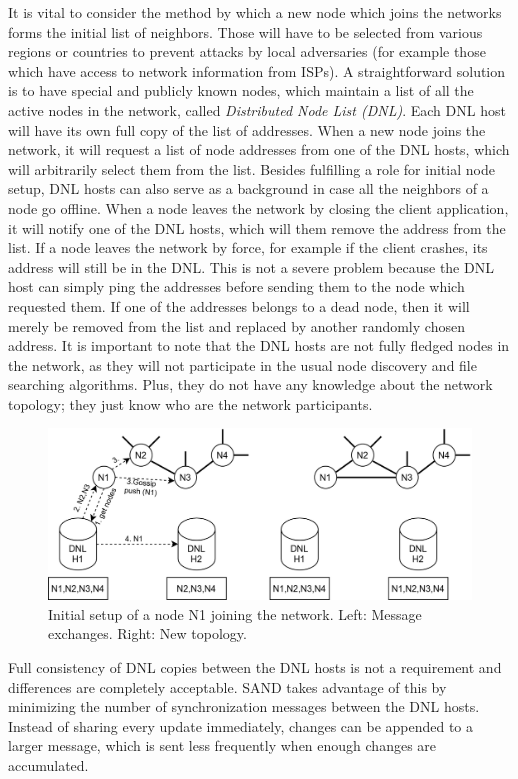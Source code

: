 It is vital to consider the method by which a new node which joins the networks 
forms the initial list of neighbors. Those will have to be selected from 
various regions or countries to prevent attacks by local adversaries (for 
example those which have access to network information from ISPs). A 
straightforward solution is to have special and publicly known nodes, which 
maintain a list of all the active nodes in the network, called 
\textit{Distributed Node List (DNL)}. Each DNL host will have its own full copy 
of the list of addresses. When a new node joins the network, it will request a 
list of node addresses from one of the DNL hosts, which will arbitrarily select 
them from the list. Besides fulfilling a role for initial node setup, DNL hosts 
can also serve as a background in case all the neighbors of a node go offline. 
When a node leaves the network by closing the client application, it will 
notify one of the DNL hosts, which will them remove the address from the list. 
If a node leaves the network by force, for example if the client crashes, its 
address will still be in the DNL. This is not a severe problem because the DNL 
host can simply ping the addresses before sending them to the node which 
requested them. If one of the addresses belongs to a dead node, then it will 
merely be removed from the list and replaced by another randomly chosen 
address. It is important to note that the DNL hosts are not fully fledged nodes 
in the network, as they will not participate in the usual node discovery and 
file searching algorithms. Plus, they do not have any knowledge about the 
network topology; they just know who are the network participants.

\begin{figure}
    \centering
    \includegraphics[width=\textwidth]{figures/fig2}
    \caption{Initial setup of a node N1 joining the network. Left: Message 
exchanges. Right: New topology.}
    \label{fig:fig2}
\end{figure}

Full consistency of DNL copies between the DNL hosts is not a requirement and 
differences are completely acceptable. SAND takes advantage of this by 
minimizing the number of synchronization messages between the DNL hosts. 
Instead of sharing every update immediately, changes can be appended to a 
larger message, which is sent less frequently when enough changes are 
accumulated.
